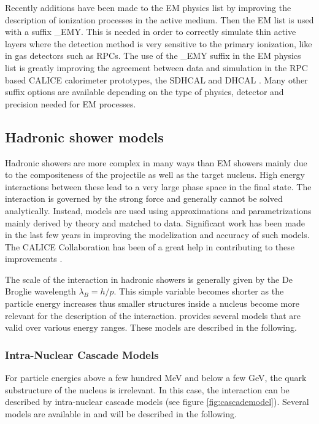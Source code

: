 Recently additions have been made to the \geant EM physics list by improving the description of ionization processes in the active medium. Then the EM list is used with a suffix \_{}EMY. This is needed in order to correctly simulate thin active layers where the detection method is very sensitive to the primary ionization, like in gas detectors such as RPCs. The use of the \_{}EMY suffix in the EM physics list is greatly improving the agreement between data and simulation in the RPC based CALICE calorimeter prototypes, the SDHCAL and DHCAL \cite{Neubueser2016}. Many other suffix options are available depending on the type of physics, detector and precision needed for EM processes.

\subsection{Hadronic shower models}

Hadronic showers are more complex in many ways than EM showers mainly due to the compositeness of the projectile as well as the target nucleus. High energy interactions between these lead to a very large phase space in the final state. The interaction is governed by the strong force and generally cannot be solved analytically. Instead, models are used using approximations and parametrizations mainly derived by theory and matched to data. Significant work has been made in the last few years in improving the modelization and accuracy of such models. The CALICE Collaboration has been of a great help in contributing to these improvements \cite{Adloff2013, Bilki2015}.

The scale of the interaction in hadronic showers is generally given by the De Broglie wavelength $\lambda_{B} = h/p$. This simple variable becomes shorter as the particle energy increases thus smaller structures inside a nucleus become more relevant for the description of the interaction. \geant provides several models that are valid over various energy ranges. These models are described in the following.

\subsubsection{Intra-Nuclear Cascade Models}

For particle energies above a few hundred MeV and below a few GeV, the quark substructure of the nucleus is irrelevant. In this case, the interaction can be described by intra-nuclear cascade models (see figure \ref{fig:cascademodel}). Several models are available in \geant and will be described in the following.\\

